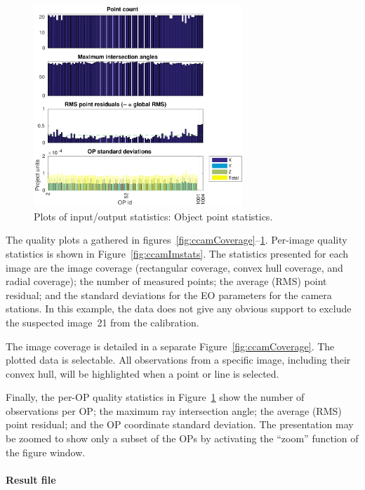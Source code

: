 \documentclass{article}
\begin{document}
\begin{figure}
  \centering
  \includegraphics[width=0.7\textwidth]{ill/ccamopstats}
  \caption{Plots of input/output statistics: Object point statistics.}
  \label{fig:ccamOPstats}
\end{figure}

The quality plots a gathered in
figures~\ref{fig:ccamCoverage}--\ref{fig:ccamOPstats}. Per-image
quality statistics is shown in Figure~\ref{fig:ccamImstats}. The
statistics presented for each image are the image coverage
(rectangular coverage, convex hull coverage, and radial coverage); the
number of measured points; the average (RMS) point residual; and the
standard deviations for the EO parameters for the camera stations. In
this example, the data does not give any obvious support to exclude
the suspected image~21 from the calibration.

The image coverage is detailed in a separate
Figure~\ref{fig:ccamCoverage}. The plotted data is selectable. All
observations from a specific image, including their convex hull, will
be highlighted when a point or line is selected.

Finally, the per-OP quality statistics in Figure~\ref{fig:ccamOPstats}
show the number of observations per OP; the maximum ray intersection
angle; the average (RMS) point residual; and the OP coordinate
standard deviation. The presentation may be zoomed to show only a
subset of the OPs by activating the ``zoom'' function of the figure
window.

\paragraph{Result file}
\end{document}
